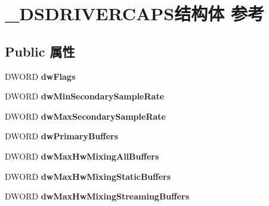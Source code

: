 \hypertarget{struct___d_s_d_r_i_v_e_r_c_a_p_s}{}\section{\+\_\+\+D\+S\+D\+R\+I\+V\+E\+R\+C\+A\+P\+S结构体 参考}
\label{struct___d_s_d_r_i_v_e_r_c_a_p_s}
\subsection*{Public 属性}
\begin{DoxyCompactItemize}
\item 
\mbox{\label{struct___d_s_d_r_i_v_e_r_c_a_p_s_a0704de91ecd557f58309f32248c67f57}} 
D\+W\+O\+RD {\bfseries dw\+Flags}
\item 
\mbox{\label{struct___d_s_d_r_i_v_e_r_c_a_p_s_ac3e2d499065fccde2c808da3f8ad7742}} 
D\+W\+O\+RD {\bfseries dw\+Min\+Secondary\+Sample\+Rate}
\item 
\mbox{\label{struct___d_s_d_r_i_v_e_r_c_a_p_s_a7a7b3f4a36198669468414c35706e25c}} 
D\+W\+O\+RD {\bfseries dw\+Max\+Secondary\+Sample\+Rate}
\item 
\mbox{\label{struct___d_s_d_r_i_v_e_r_c_a_p_s_a764300c77b15ba70c9b079625a584e59}} 
D\+W\+O\+RD {\bfseries dw\+Primary\+Buffers}
\item 
\mbox{\label{struct___d_s_d_r_i_v_e_r_c_a_p_s_a01788a2e08f92616f9f02637dcb0d991}} 
D\+W\+O\+RD {\bfseries dw\+Max\+Hw\+Mixing\+All\+Buffers}
\item 
\mbox{\label{struct___d_s_d_r_i_v_e_r_c_a_p_s_a949fb40953285187fd54def0b5cca9a0}} 
D\+W\+O\+RD {\bfseries dw\+Max\+Hw\+Mixing\+Static\+Buffers}
\item 
\mbox{\label{struct___d_s_d_r_i_v_e_r_c_a_p_s_a5211460a0df4dba6b4a18d32b711f0f1}} 
D\+W\+O\+RD {\bfseries dw\+Max\+Hw\+Mixing\+Streaming\+Buffers}
\item 
\mbox{\label{struct___d_s_d_r_i_v_e_r_c_a_p_s_a6ef0b34326cf22b3aad7edc271c34c2a}} 

\end{DoxyCompactItemize}
